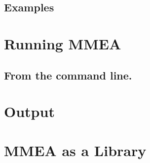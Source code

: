 \documentclass{article}
\begin{document}
\subsection{Examples}
\label{examples}

\section{Running MMEA}

\subsection{From the command line.}


\section{Output}

\section{MMEA as a Library}
\end{document}
